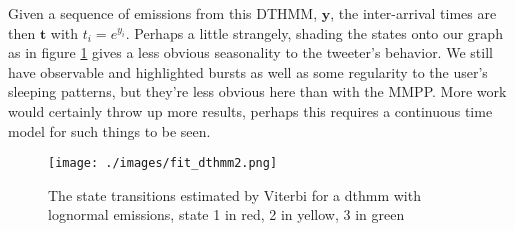 Given a sequence of emissions from this DTHMM, $\mathbf{y}$, the inter-arrival times are then $\mathbf{t}$ with $t_i = e^{y_i}$. Perhaps a little strangely, shading the states onto our graph as in figure \ref{fit_dthmm2}
gives a less obvious seasonality to the tweeter's behavior. We still have observable and highlighted bursts as well as some regularity to the user's sleeping patterns, but they're less obvious here than with the MMPP. More work would certainly throw up more results, perhaps this requires a continuous time model for such things to be seen.

\begin{figure}
\texttt{[image: ./images/fit\_dthmm2.png]}
\caption{The state transitions estimated by Viterbi for a dthmm with lognormal emissions, state 1 in red, 2 in yellow, 3 in green}
\label{fit_dthmm2}
\end{figure}

